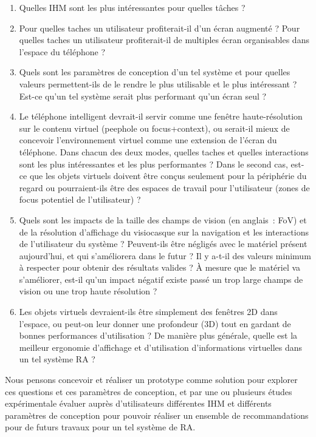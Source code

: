 \begin{enumerate}
	\item Quelles IHM sont les plus intéressantes pour quelles tâches ?
	\item Pour quelles taches un utilisateur profiterait-il d'un écran augmenté ? Pour quelles taches un utilisateur profiterait-il de multiples écran organisables dans l'espace du téléphone ?
	\item Quels sont les paramètres de conception d'un tel système et pour quelles valeurs permettent-ils de le rendre le plus utilisable et le plus intéressant ? Est-ce qu'un tel système serait plus performant qu'un écran seul ?
	\item Le téléphone intelligent devrait-il servir comme une fenêtre haute-résolution sur le contenu virtuel (peephole ou focus+context), ou serait-il mieux de concevoir l'environnement virtuel comme une extension de l'écran du téléphone. Dans chacun des deux modes, quelles taches et quelles interactions sont les plus intéressantes et les plus performantes ? Dans le second cas, est-ce que les objets virtuels doivent être conçus seulement pour la périphérie du regard ou pourraient-ils être des espaces de travail pour l'utilisateur (zones de focus potentiel de l'utilisateur) ?
	\item Quels sont les impacts de la taille des champs de vision (en anglais~: FoV) et de la résolution d'affichage du visiocasque sur la navigation et les interactions de l'utilisateur du système ? Peuvent-ils être négligés avec le matériel présent aujourd'hui, et qui s'améliorera dans le futur ? Il y a-t-il des valeurs minimum à respecter pour obtenir des résultats valides ? À mesure que le matériel va s'améliorer, est-il qu'un impact négatif existe passé un trop large champs de vision ou une trop haute résolution ?
	\item Les objets virtuels devraient-ils être simplement des fenêtres 2D dans l'espace, ou peut-on leur donner une profondeur (3D) tout en gardant de bonnes performances d'utilisation ? De manière plus générale, quelle est la meilleur ergonomie d'affichage et d'utilisation d'informations virtuelles dans un tel système RA ?
\end{enumerate}

Nous pensons concevoir et réaliser un prototype comme solution pour explorer ces questions et ces paramètres de conception, et par une ou plusieurs études expérimentale évaluer auprès d'utilisateurs différentes IHM et différents paramètres de conception pour pouvoir réaliser un ensemble de recommandations pour de futurs travaux pour un tel système de RA.

